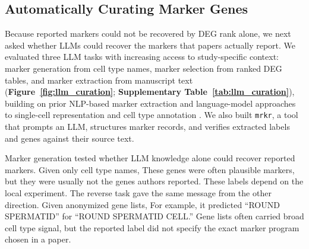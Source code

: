 \documentclass[10pt,twocolumn]{article}
\theoremstyle{plain}
\theoremstyle{definition}
\theoremstyle{remark}
\begin{document}
\subsection*{Automatically Curating Marker Genes}

Because reported markers could not be recovered by DEG rank alone, we next asked whether LLMs could recover the markers that papers actually report. We evaluated three LLM tasks with increasing access to study-specific context: marker generation from cell type names, marker selection from ranked DEG tables, and marker extraction from manuscript text (\textbf{Figure~\ref{fig:llm_curation}}; \textbf{Supplementary Table~\ref{tab:llm_curation}}), building on prior NLP-based marker extraction and language-model approaches to single-cell representation and cell type annotation \citep{Cheng_2024,Hou_2024,Levine2023Cell2Sentence,Zhao2024LangCell,Schaefer2025CellWhisperer,Yang2025LLMConsensus}. We also built \texttt{mrkr}, a tool that prompts an LLM, structures marker records, and verifies extracted labels and genes against their source text.

Marker generation tested whether LLM knowledge alone could recover reported markers. Given only cell type names,  These genes were often plausible markers, but they were usually not the genes authors reported.  These labels depend on the local experiment. The reverse task gave the same message from the other direction. Given anonymized gene lists,  For example, it predicted ``ROUND SPERMATID'' for ``ROUND SPERMATID CELL.'' Gene lists often carried broad cell type signal, but the reported label did not specify the exact marker program chosen in a paper.
\end{document}
